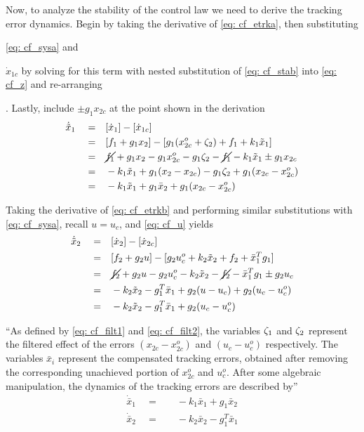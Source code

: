 \documentclass[12pt]{ucthesis}
\begin{document}
Now, to analyze the stability of the control law we need to derive the tracking error dynamics. Begin by taking the derivative of \autoref{eq: cf_etrka}, then substituting \begin{inparaenum} \item{ \autoref{eq: cf_sysa}} and \item{$\dot{x}_{1c}$ by solving for this term with nested substitution of \autoref{eq: cf_stab} into \autoref{eq: cf_z} and re-arranging}\end{inparaenum}. Lastly, include $\pm g_1 x_{2c}$ at the point shown in the derivation
	\begin{align} \label{eq: cf_etrk_dyn1}
		\dot{\tilde{x}}_1 \quad=&\quad [\dot{x}_1] - [\dot{x}_{1c}] \nonumber \\
		 \quad=&\quad [f_1 + g_1 x_2] - [g_1(x^o_{2c} + \zeta_2) + f_1 + k_1 \tilde{x}_1] \nonumber \\
		 \quad=&\quad \cancel{f_1} + g_1 x_2 - g_1 x^o_{2c} - g_1 \zeta_2 - \cancel{f_1} - k_1 \tilde{x}_1 \pm g_1 x_{2c} \nonumber \\
		 \quad=&\quad -k_1 \tilde{x}_1 + g_1(x_2 - x_{2c}) - g_1 \zeta_2 + g_1(x_{2c} - x^o_{2c})\nonumber \\
		 \quad=&\quad -k_1 \tilde{x}_1 + g_1 \bar{x}_2 + g_1(x_{2c} - x^o_{2c})
	\end{align}

Taking the derivative of \autoref{eq: cf_etrkb} and performing similar substitutions with \autoref{eq: cf_sysa}, recall $u = u_c$, and \autoref{eq: cf_u} yields
	\begin{align} \label{eq: cf_etrk_dyn2}
		\dot{\tilde{x}}_2 \quad=&\quad [\dot{x}_2] - [\dot{x}_{2c}] \nonumber \\
		 \quad=&\quad [f_2 + g_2 u] - [g_2 u^o_c + k_2 \tilde{x}_2 + f_2 + \bar{x}^T_1 g_1] \nonumber \\
		 \quad=&\quad \cancel{f_2} + g_2 u - g_2 u^o_c - k_2 \tilde{x}_2 - \cancel{f_2} - \bar{x}^T_1 g_1 \pm g_2 u_c \nonumber \\
		 \quad=&\quad - k_2 \tilde{x}_2 - g_1^T \bar{x}_1 + g_2(u - u_c) + g_2(u_c - u^o_c) \nonumber \\
		 \quad=&\quad - k_2 \tilde{x}_2 - g_1^T \bar{x}_1 + g_2(u_c - u^o_c) 
	\end{align}

``As defined by \ref{eq: cf_filt1} and \ref{eq: cf_filt2}, the variables $\zeta_1$ and $\zeta_2$ represent the filtered effect of the errors $(x_{2c} - x^o_{2c})$ and $(u_c - u^o_c)$ respectively. The variables $\bar{x}_i$ represent the compensated tracking errors, obtained after removing the corresponding unachieved portion of $x^o_{2c}$ and $u^o_c$. After some algebraic manipulation, the dynamics of the tracking errors are described by''
	\begin{align} 
		\label{eq: cf_ctrk_dyn_a} \dot{\bar{x}}_1 \quad=&\quad -k_1 \bar{x}_1 + g_1 \bar{x}_2 \\
		\label{eq: cf_ctrk_dyn_b} \dot{\bar{x}}_2 \quad=&\quad -k_2 \bar{x}_2 - g^T_1 \bar{x}_1
	\end{align}
\end{document}
